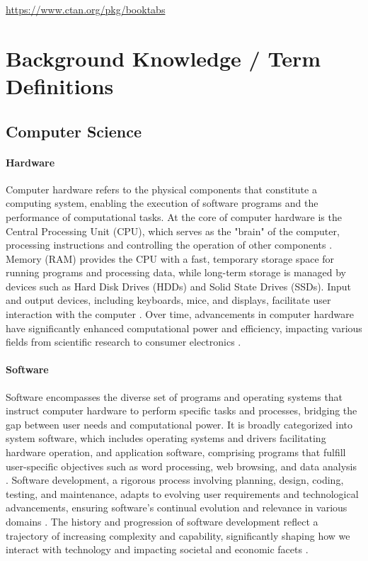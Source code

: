 \documentclass{article}
\begin{document}
\begin{center}
  \url{https://www.ctan.org/pkg/booktabs}
\end{center}

  
  

\appendix

\section{Background Knowledge / Term Definitions}
\label{sec:background}

\subsection{Computer Science}

\paragraph{Hardware}
Computer hardware refers to the physical components that constitute a computing system, enabling the execution of software programs and the performance of computational tasks. At the core of computer hardware is the Central Processing Unit (CPU), which serves as the "brain" of the computer, processing instructions and controlling the operation of other components \cite{Stallings2016}. Memory (RAM) provides the CPU with a fast, temporary storage space for running programs and processing data, while long-term storage is managed by devices such as Hard Disk Drives (HDDs) and Solid State Drives (SSDs). Input and output devices, including keyboards, mice, and displays, facilitate user interaction with the computer \cite{HennessyPatterson2017}. Over time, advancements in computer hardware have significantly enhanced computational power and efficiency, impacting various fields from scientific research to consumer electronics \cite{Mack2011}.

\paragraph{Software}
Software encompasses the diverse set of programs and operating systems that instruct computer hardware to perform specific tasks and processes, bridging the gap between user needs and computational power. It is broadly categorized into system software, which includes operating systems and drivers facilitating hardware operation, and application software, comprising programs that fulfill user-specific objectives such as word processing, web browsing, and data analysis \cite{Sommerville2016}. Software development, a rigorous process involving planning, design, coding, testing, and maintenance, adapts to evolving user requirements and technological advancements, ensuring software's continual evolution and relevance in various domains \cite{Pressman2014}. The history and progression of software development reflect a trajectory of increasing complexity and capability, significantly shaping how we interact with technology and impacting societal and economic facets \cite{Ensmenger2012}.
\end{document}
